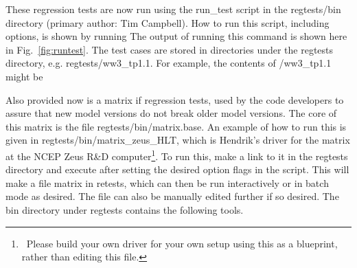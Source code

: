 \begin{flist}
\end{flist}

\noindent
These regression tests are now run using the {\file run\_test} script in the
{\file regtests/bin} directory (primary author: Tim Campbell). How to run this
script, including options, is shown by running  The
output of running this command is shown here in Fig.~\ref{fig:runtest}.  The
test cases are stored in directories under the {\file regtests} directory,
e.g.  {\file regtests/ww3\_tp1.1}. For example, the contents of {\file
/ww3\_tp1.1} might be

\begin{flist}
\end{flist}

\noindent
Also provided now is a matrix if regression tests, used by the code developers
to assure that new model versions do not break older model versions. The core
of this matrix is the file {\file regtests/bin/matrix.base}. An example of how
to run this is given in {\file regtests/bin/matrix\_zeus\_HLT}, which is
Hendrik's driver for the matrix at the NCEP Zeus R\&D
computer\footnote{~Please build your own driver for your own setup using this
as a blueprint, rather than editing this file.}. To run this, make a link to
it in the {\file regtests} directory and execute after setting the desired
option flags in the script. This will make a file {\file matrix} in {\file
retests}, which can then be run interactively or in batch mode as desired. The
file can also be manually edited further if so desired. The {\file bin}
directory under {\file regtests} contains the following tools.

